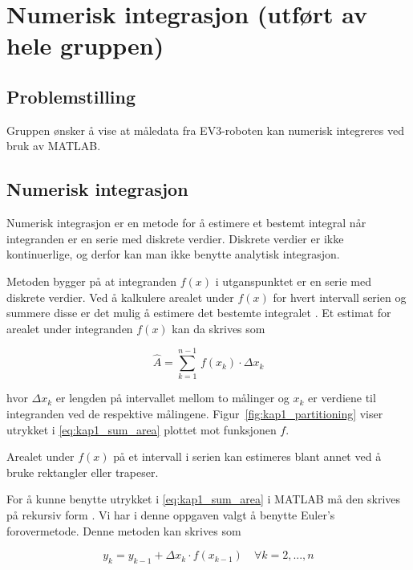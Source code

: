 \documentclass[main.tex]{subfiles}
\begin{document}
\chapter{Numerisk integrasjon (utført av hele gruppen) }\label{kap:integrasjon}

\section{Problemstilling}
Gruppen ønsker å vise at måledata fra \textsc{EV3}-roboten kan numerisk integreres ved bruk av \textsc{MATLAB}.

\section{Numerisk integrasjon}
Numerisk integrasjon er en metode for å estimere et bestemt integral når integranden er en serie med diskrete verdier. Diskrete verdier er ikke kontinuerlige, og derfor kan man ikke benytte analytisk integrasjon.

Metoden bygger på at integranden $f(x)$ i utganspunktet er en serie med diskrete verdier. Ved å kalkulere arealet under $f(x)$ for hvert intervall serien og summere disse er det mulig å estimere det bestemte integralet \parencite[s. 297–301]{AdaEss2017}. Et estimat for arealet under integranden $f(x)$ kan da skrives som

\begin{equation}\label{eq:kap1_sum_area}
    \hat{A} =\sum_{k=1}^{n-1} \, f(x_k) \cdot \Delta x_k
\end{equation}

hvor $\Delta x_k$ er lengden på intervallet mellom to målinger og $x_k$ er verdiene til integranden ved de respektive målingene. Figur~\ref{fig:kap1_partitioning} viser utrykket i \eqref{eq:kap1_sum_area} plottet mot funksjonen $f$.

Arealet under $f(x)$ på et intervall i serien kan estimeres blant annet ved å bruke rektangler eller trapeser.



For å kunne benytte utrykket i \eqref{eq:kap1_sum_area} i \textsc{MATLAB} må den skrives på rekursiv form \parencite[s.~53–58]{Dre2023Simulink}. Vi har i denne oppgaven valgt å benytte Euler's forovermetode. Denne metoden kan skrives som

\begin{equation}\label{eq:kap1_area_rec}
    y_k = y_{k-1} + \Delta{x_k} \cdot f(x_{k-1}) \quad \forall k=2,..., n
\end{equation}
\end{document}
